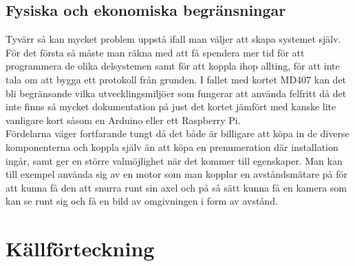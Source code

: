 \documentclass{article}
\begin{document}
\subsection{Fysiska och ekonomiska begränsningar}
\noindent
Tyvärr så kan mycket problem uppstå ifall man väljer att skapa systemet själv.
För det första så måste man räkna med att få spendera mer tid för att programmera de olika delsystemen samt för att koppla ihop allting, för att inte tala om att bygga ett protokoll från grunden.
I fallet med kortet MD407 kan det bli begränsande vilka utvecklingsmiljöer som fungerar att använda felfritt då det inte finns så mycket dokumentation på just det kortet jämfört med kanske lite vanligare kort såsom en Arduino eller ett Raspberry Pi.\\

\noindent
Fördelarna väger fortfarande tungt då det både är billigare att köpa in de diverse komponenterna och koppla själv än att köpa en prenumeration där installation ingår, samt ger en större valmöjlighet när det kommer till egenskaper. 
Man kan till exempel använda sig av en motor som man kopplar en avståndsmätare på för att kunna få den att snurra runt sin axel och på så sätt kunna få en kamera som kan se runt sig och få en bild av omgivningen i form av avstånd.\\


\newpage
\begin{appendix}







\end{appendix}



\newpage

\section*{Källförteckning}
\printbibliography[heading=none]
\end{document}
